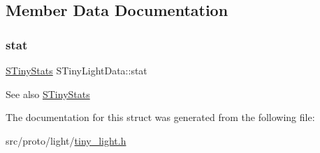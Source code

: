 \subsection{Member Data Documentation}
\mbox{\label{structSTinyLightData_a623323a7a84807b5ce14a7cb56ec07f0}} 
\subsubsection{\texorpdfstring{stat}{stat}}
{\footnotesize\ttfamily \hyperlink{structSTinyStats}{S\+Tiny\+Stats} S\+Tiny\+Light\+Data\+::stat}

\begin{DoxySeeAlso}{See also}
\hyperlink{structSTinyStats}{S\+Tiny\+Stats} 
\end{DoxySeeAlso}


The documentation for this struct was generated from the following file\+:\begin{DoxyCompactItemize}
\item 
src/proto/light/\hyperlink{tiny__light_8h}{tiny\+\_\+light.\+h}\end{DoxyCompactItemize}
